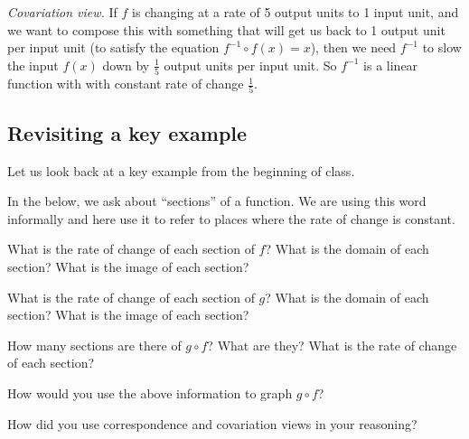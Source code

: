 \documentclass[11pt]{article}
\newenvironment{task}
	{\begin{mdframed}[linecolor=lightgray, linewidth=3pt]\raggedright}
	{\end{mdframed}}
\theoremstyle{definition}
\begin{document}
{\it Covariation view.} If $f$ is changing at a rate of 5 output units to 1 input unit, and we want to compose this with something that will get us back to 1 output unit per input unit (to satisfy the equation $f^{-1}\circ f(x)=x$), then we need $f^{-1}$ to slow the input $f(x)$ down by $\frac{1}{5}$ output units per input unit. So $f^{-1}$ is a linear function with with constant rate of change $\frac{1}{5}$.

\subsection{Revisiting a key example}

Let us look back at a key example from the beginning of class. 

\begin{center}
\end{center}

In the below, we ask about ``sections'' of a function. We are using this word informally and here use it to refer to  places where the rate of change is constant.

\begin{task}
What is the rate of change of each section of $f$? What is the domain of each section?
 What is the image of each section?

What is the rate of change of each section of $g$? What is the domain of each section?  What is the image of each section?

How many sections are there of $g\circ f$? What are they? What is the rate of change of each section?

How would you use the above information to graph $g\circ f$?

How did you use correspondence and covariation views in your reasoning?
\end{task}
\end{document}
